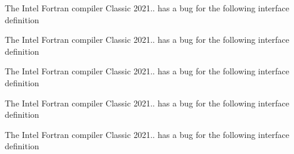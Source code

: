 
\begin{DoxyRefList}
\item[Type \mbox{\hyperlink{interfaceArrayFind__mod_1_1genReplaced}{Array\+Find\+\_\+mod\+::gen\+Replaced}} ]\label{bug__bug000001}%
%
 The Intel Fortran compiler Classic 2021.. has a bug for the following interface definition  
\item[Type \mbox{\hyperlink{interfaceArrayFind__mod_1_1getReplaced}{Array\+Find\+\_\+mod\+::get\+Replaced}} ]\label{bug__bug000002}%
%
 The Intel Fortran compiler Classic 2021.. has a bug for the following interface definition  
\item[Type \mbox{\hyperlink{interfaceArrayReplace__mod_1_1genReplaced}{Array\+Replace\+\_\+mod\+::gen\+Replaced}} ]\label{bug__bug000003}%
%
 The Intel Fortran compiler Classic 2021.. has a bug for the following interface definition  
\item[Type \mbox{\hyperlink{interfaceArrayReplace__mod_1_1getReplaced}{Array\+Replace\+\_\+mod\+::get\+Replaced}} ]\label{bug__bug000004}%
%
 The Intel Fortran compiler Classic 2021.. has a bug for the following interface definition  
\item[Type \mbox{\hyperlink{interfaceArrayUnique__mod_1_1genUnique}{Array\+Unique\+\_\+mod\+::gen\+Unique}} ]\label{bug__bug000005}%
%
 The Intel Fortran compiler Classic 2021.. has a bug for the following interface definition 
\end{DoxyRefList}